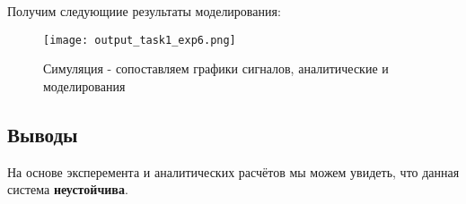 Получим следующиие результаты моделирования:
\begin{figure}[ht]
    \centering
    \texttt{[image: output\_task1\_exp6.png]}
	\caption{Симуляция - сопоставляем графики сигналов, аналитические и моделирования}
\end{figure}
\subsection{Выводы}
На основе эксперемента и аналитических расчётов мы можем увидеть, что данная система \textbf{неустойчива}.

\endinput